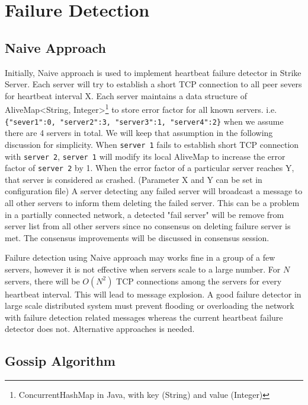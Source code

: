 \documentclass[dareport.tex]{subfiles}
\begin{document}
\section{Failure Detection}
\subsection{Naive Approach}

Initially, Naive approach is used to implement heartbeat failure detector in Strike Server. Each server will try to establish a short TCP connection to all peer severs for heartbeat interval X. Each server maintains a data structure of AliveMap<String, Integer>\footnote{ConcurrentHashMap in Java, with key (String) and value (Integer) } to store error factor for all known servers. i.e. \verb|{"sever1":0, "server2":3, "server3":1, "server4":2}| when we assume there are 4 servers in total. We will keep that assumption in the following discussion for simplicity. When \verb|server 1| fails to establish short TCP connection with \verb|server 2|, \verb|server 1| will modify its local AliveMap to increase the error factor of \verb|server 2| by 1. When the error factor of a particular server reaches Y, that server is considered as crashed. (Parameter X and Y can be set in configuration file) A server detecting any failed server will broadcast a message to all other servers to inform them deleting the failed server. This can be a problem in a partially connected network, a detected "fail server" will be remove from server list from all other servers since no consensus on deleting failure server is met. The consensus improvements will be discussed in consensus session.

Failure detection using Naive approach may works fine in a group of a few servers, however it is not effective when servers scale to a large number. For $N$ servers, there will be $O(N^{2})$ TCP connections among the servers for every heartbeat interval. This will lead to message explosion\cite{failuredetector}. A good failure detector in large scale distributed system must prevent flooding or overloading the network with failure detection related messages whereas the current heartbeat failure detector does not. Alternative approaches is needed.

\subsection{Gossip Algorithm}
\end{document}
